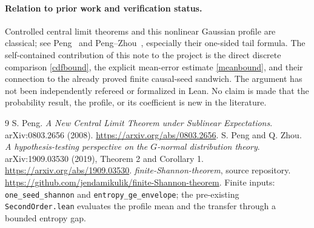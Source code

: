 \documentclass[10pt,a4paper]{article}
\begin{document}
\paragraph{Relation to prior work and verification status.}
Controlled central limit theorems and this nonlinear Gaussian profile are
classical; see Peng~\cite{peng} and Peng--Zhou~\cite{pz}, especially their
one-sided tail formula. The self-contained contribution of this note to the
project is the direct discrete comparison \eqref{cdfbound}, the explicit
mean-error estimate \eqref{meanbound}, and their connection to the already
proved finite causal-seed sandwich. The argument has not been independently
refereed or formalized in Lean. No claim is made that the probability result,
the profile, or its coefficient is new in the literature.

\begin{thebibliography}{9}
 S. Peng. \emph{A New Central Limit Theorem under Sublinear
Expectations}. arXiv:0803.2656 (2008).
\url{https://arxiv.org/abs/0803.2656}.
 S. Peng and Q. Zhou. \emph{A hypothesis-testing perspective on the
$G$-normal distribution theory}. arXiv:1909.03530 (2019), Theorem 2 and
Corollary 1. \url{https://arxiv.org/abs/1909.03530}.
 \emph{finite-Shannon-theorem}, source repository.
\url{https://github.com/jendamikulik/finite-Shannon-theorem}.
Finite inputs: \texttt{one\_seed\_shannon} and \texttt{entropy\_ge\_envelope};
the pre-existing \texttt{SecondOrder.lean} evaluates the profile mean and
the transfer through a bounded entropy gap.
\end{thebibliography}
\end{document}
